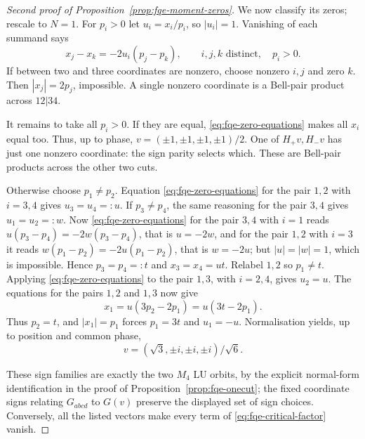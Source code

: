 \begin{proof}[Second proof of Proposition~\ref{prop:fqe-moment-zeros}]
We now classify its zeros; rescale to \(N=1\). For \(p_i>0\) let \(u_i=x_i/p_i\), so \(|u_i|=1\).
Vanishing of each summand says \[
x_j-x_k=-2u_i(p_j-p_k),\qquad i,j,k\text{ distinct},\quad p_i>0. \tag{ZE}\label{eq:fqe-zero-equations}
\] If between two and three coordinates are nonzero, choose nonzero \(i,j\) and zero \(k\). Then
\(|x_j|=2p_j\), impossible. A single nonzero coordinate is a Bell-pair product across \(12|34\).

It remains to take all \(p_i>0\). If they are equal, \eqref{eq:fqe-zero-equations} makes all \(x_i\)
equal too. Thus, up to phase, \(v=(\pm1,\pm1,\pm1,\pm1)/2\). One of \(H_+v,H_-v\) has just one
nonzero coordinate: the sign parity selects which. These are Bell-pair products across the other two
cuts.

Otherwise choose \(p_1\ne p_2\). Equation \eqref{eq:fqe-zero-equations} for the pair \(1,2\) with \(i=3,4\) gives
\(u_3=u_4=:u\). If \(p_3\ne p_4\), the same reasoning for the pair \(3,4\) gives \(u_1=u_2=:w\). Now
\eqref{eq:fqe-zero-equations} for the pair \(3,4\) with \(i=1\) reads \(u(p_3-p_4)=-2w(p_3-p_4)\), that is
\(u=-2w\), and for the pair \(1,2\) with \(i=3\) it reads \(w(p_1-p_2)=-2u(p_1-p_2)\), that is \(w=-2u\); but
\(|u|=|w|=1\), which is impossible. Hence
\(p_3=p_4=:t\) and \(x_3=x_4=ut\). Relabel \(1,2\) so \(p_1\ne t\). Applying
\eqref{eq:fqe-zero-equations} to the pair \(1,3\), with \(i=2,4\), gives \(u_2=u\). The equations
for the pairs \(1,2\) and \(1,3\) now give \[
x_1=u(3p_2-2p_1)=u(3t-2p_1).
\] Thus \(p_2=t\), and \(|x_1|=p_1\) forces \(p_1=3t\) and \(u_1=-u\). Normalisation yields, up to
position and common phase, \[
v=(\sqrt3,\pm i,\pm i,\pm i)/\sqrt6. \tag{HS}\label{eq:fqe-hs-family}
\]

These sign families are exactly the two $M_4$ LU orbits, by the explicit normal-form
identification in the proof of Proposition~\ref{prop:fqe-onecut}; the fixed coordinate signs
relating $G_{abcd}$ to $G(v)$ preserve the displayed set of sign choices. Conversely, all the
listed vectors make every term of \eqref{eq:fqe-critical-factor} vanish.
\end{proof}
